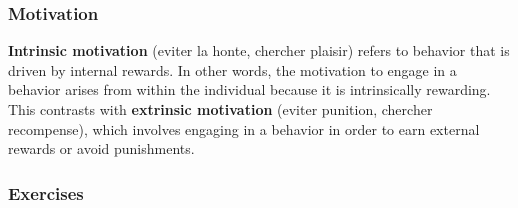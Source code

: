 \subsubsection{Motivation}

\textbf{Intrinsic motivation} (eviter la honte, chercher plaisir) refers to behavior that is driven by internal rewards. In other words, the motivation to engage in a behavior arises from within the individual because it is intrinsically rewarding. This contrasts with \textbf{extrinsic motivation} (eviter punition, chercher recompense), which involves engaging in a behavior in order to earn external rewards or avoid punishments.

\subsubsection{Exercises}

\begin{figure}[H]
\centering
{}
\end{figure}



